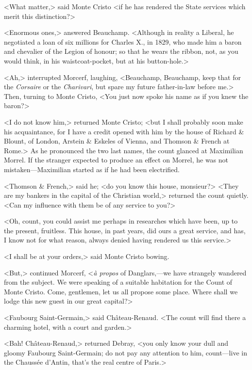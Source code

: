  <What matter,> said Monte Cristo <if he has rendered the State services which merit this distinction?> 

 <Enormous ones,> answered Beauchamp. <Although in reality a Liberal, he negotiated a loan of six millions for Charles X., in 1829, who made him a baron and chevalier of the Legion of honour; so that he wears the ribbon, not, as you would think, in his waistcoat-pocket, but at his button-hole.> 

 <Ah,> interrupted Morcerf, laughing, <Beauchamp, Beauchamp, keep that for the \textit{Corsaire} or the \textit{Charivari}, but spare my future father-in-law before me.> Then, turning to Monte Cristo, <You just now spoke his name as if you knew the baron?> 

 <I do not know him,> returned Monte Cristo; <but I shall probably soon make his acquaintance, for I have a credit opened with him by the house of Richard \& Blount, of London, Arstein \& Eskeles of Vienna, and Thomson \& French at Rome.> As he pronounced the two last names, the count glanced at Maximilian Morrel. If the stranger expected to produce an effect on Morrel, he was not mistaken—Maximilian started as if he had been electrified. 

 <Thomson \& French,> said he; <do you know this house, monsieur?>  <They are my bankers in the capital of the Christian world,> returned the count quietly. <Can my influence with them be of any service to you?> 

 <Oh, count, you could assist me perhaps in researches which have been, up to the present, fruitless. This house, in past years, did ours a great service, and has, I know not for what reason, always denied having rendered us this service.> 

 <I shall be at your orders,> said Monte Cristo bowing. 

 <But,> continued Morcerf, <\textit{à propos} of Danglars,—we have strangely wandered from the subject. We were speaking of a suitable habitation for the Count of Monte Cristo. Come, gentlemen, let us all propose some place. Where shall we lodge this new guest in our great capital?> 

 <Faubourg Saint-Germain,> said Château-Renaud. <The count will find there a charming hotel, with a court and garden.> 

 <Bah! Château-Renaud,> returned Debray, <you only know your dull and gloomy Faubourg Saint-Germain; do not pay any attention to him, count—live in the Chaussée d'Antin, that's the real centre of Paris.> 

